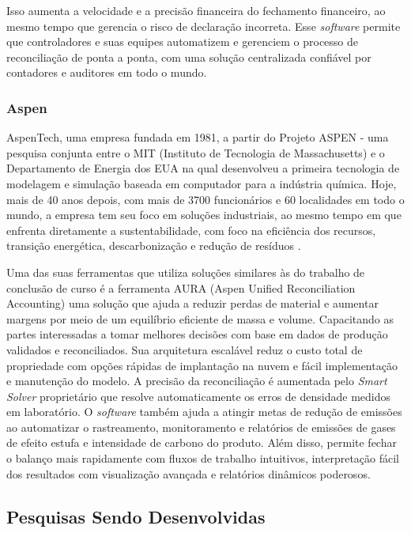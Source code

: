 Isso aumenta a velocidade e a precisão financeira do fechamento financeiro, ao mesmo tempo que gerencia o risco de declaração incorreta. Esse \textit{software} permite que controladores e suas equipes automatizem e gerenciem o processo de reconciliação de ponta a ponta, com uma solução centralizada confiável por contadores e auditores em todo o mundo.

\subsubsection{Aspen}

AspenTech, uma empresa fundada em 1981, a partir do Projeto ASPEN - uma pesquisa conjunta entre o MIT (Instituto de Tecnologia de Massachusetts) e o Departamento de Energia dos EUA na qual desenvolveu a primeira tecnologia de modelagem e simulação baseada em computador para a indústria química. Hoje, mais de 40 anos depois, com mais de 3700 funcionários e 60 localidades em todo o mundo, a empresa tem seu foco em soluções industriais, ao mesmo tempo em que enfrenta diretamente a sustentabilidade, com foco na eficiência dos recursos, transição energética, descarbonização e redução de resíduos \cite{aspen}.

Uma das suas ferramentas que utiliza soluções similares às do trabalho de conclusão de curso é a ferramenta AURA (Aspen Unified Reconciliation Accounting) uma solução que ajuda a reduzir perdas de material e aumentar margens por meio de um equilíbrio eficiente de massa e volume. Capacitando as partes interessadas a tomar melhores decisões com base em dados de produção validados e reconciliados. Sua arquitetura escalável reduz o custo total de propriedade com opções rápidas de implantação na nuvem e fácil implementação e manutenção do modelo. A precisão da reconciliação é aumentada pelo \textit{Smart Solver} proprietário que resolve automaticamente os erros de densidade medidos em laboratório. O \textit{software} também ajuda a atingir metas de redução de emissões ao automatizar o rastreamento, monitoramento e relatórios de emissões de gases de efeito estufa e intensidade de carbono do produto. Além disso, permite fechar o balanço mais rapidamente com fluxos de trabalho intuitivos, interpretação fácil dos resultados com visualização avançada e relatórios dinâmicos poderosos.



\subsection{Pesquisas Sendo Desenvolvidas}

